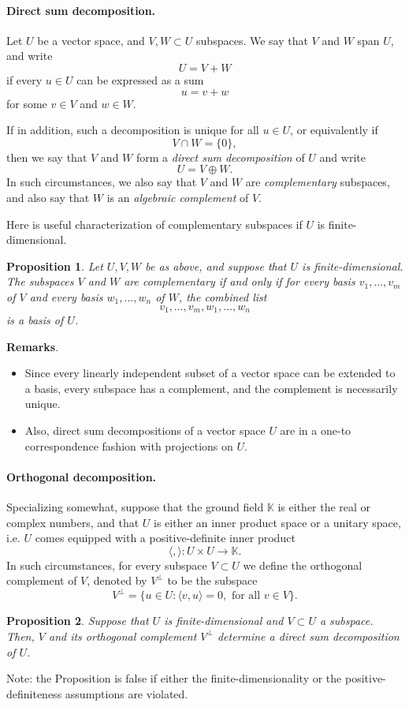 \documentclass[12pt]{article}
\newtheorem{proposition}{Proposition}
\newcommand{\kf}{\mathbb{K}}
\begin{document}
\paragraph{Direct sum decomposition.}
Let $U$ be a vector space, and $V,W\subset U$ subspaces.  We say that
$V$ and $W$ span $U$, and write
$$U=V+W$$ if 
every $u\in U$ can be expressed as a sum
$$u=v+w$$
for some $v\in V$ and $w\in W$.

If in addition, such a decomposition is unique for all $u\in U$, or
equivalently if 
$$V\cap W=\{ 0\},$$
then we say that $V$ and $W$ form a \emph{direct sum decomposition} of  $U$
and write
$$U=V\oplus W.$$
In such circumstances, we also say that $V$ and $W$
are \emph{complementary} subspaces, and also say that $W$ is an \emph{algebraic complement} of $V$.

Here is useful  characterization of complementary subspaces if $U$ is
finite-dimensional. 
\begin{proposition}
  Let $U, V, W$ be as above, and suppose that $U$ is
  finite-dimensional.  The subspaces $V$ and $W$ are complementary if
  and only if for every basis  $v_1,\ldots, v_m$  of $V$ and
  every basis
  $w_1,\ldots,w_n$  of $W$, the combined list
  $$v_1,\ldots,v_m,w_1,\ldots,w_n$$
  is a basis of $U$.
\end{proposition}

\textbf{Remarks}.
\begin{itemize}
\item
Since every linearly independent subset of a vector space can be extended to a basis, every subspace has a complement, and the complement is necessarily unique.
\item
Also, direct sum decompositions of a vector space $U$ are in a one-to correspondence fashion with projections on $U$.
\end{itemize}

\paragraph{Orthogonal decomposition.}
Specializing somewhat, suppose that the ground field $\kf$ is either
the real or complex numbers, and that $U$ is either an inner product
space or a unitary space, i.e. $U$ comes equipped with a
positive-definite inner product
$$\langle,\rangle:U\times U\rightarrow \kf.$$
In such circumstances,
for every subspace $V\subset U$ we define the orthogonal complement of
$V$, denoted by $V^\perp$ to be the subspace
$$V^\perp = \{ u\in U: \langle v,u\rangle = 0,\text{ for all }
v\in V\}.$$
\begin{proposition}
  Suppose that $U$ is finite-dimensional and $V\subset U$ a subspace.
  Then,  $V$ and its orthogonal
  complement $V^\perp$ determine a direct sum decomposition  of $U$.
  \end{proposition}
  
  Note: the Proposition is false if either the finite-dimensionality
  or the positive-definiteness assumptions are violated.
\end{document}
